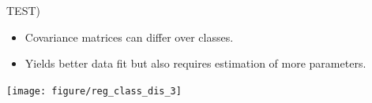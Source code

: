 \documentclass[11pt,compress,t,notes=noshow, xcolor=table]{beamer}
\begin{document}
\begin{vbframe}{TEST)}

\begin{itemize}
  \item Covariance matrices can differ over classes.
  \item Yields better data fit but also requires estimation of more parameters.
\end{itemize}

\begin{knitrout}\scriptsize
{}\color{fgcolor}

{\centering \texttt{[image: figure/reg\_class\_dis\_3]} 

}



\end{knitrout}

\end{vbframe}
\end{document}
